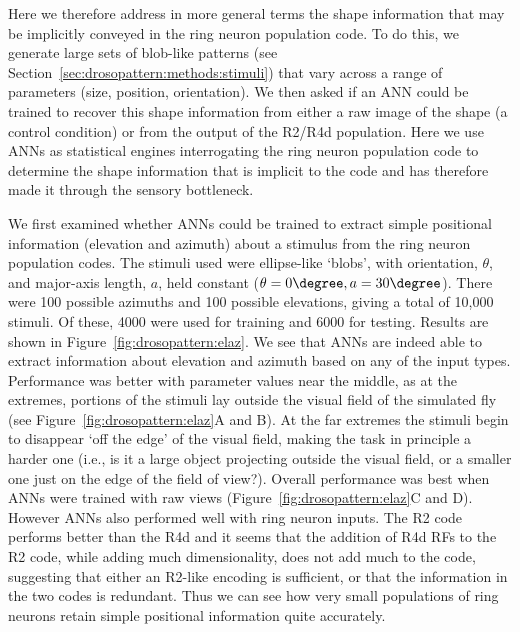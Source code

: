 Here we therefore address in more general terms the shape information that may be implicitly conveyed in the ring neuron population code.
To do this, we generate large sets of blob-like patterns (see Section~\ref{sec:drosopattern:methods:stimuli}) that vary across a range of parameters (size, position, orientation). We then asked if an \ac{ANN} could be trained to recover this shape information from either a raw image of the shape (a control condition) or from the output of the R2/R4d population. Here we use ANNs as statistical engines interrogating the ring neuron population code to determine the shape information that is implicit to the code and has therefore made it through the sensory bottleneck. 

We first examined whether ANNs could be trained to extract simple positional information (elevation and azimuth) about a stimulus from the ring neuron population codes. 
The stimuli used were ellipse-like `blobs', with orientation, $\theta$, and major-axis length, $a$, held constant ($\theta = 0\degree, a = 30\degree$).
There were 100 possible azimuths and 100 possible elevations, giving a total of 10,000 stimuli.
Of these, 4000 were used for training and 6000 for testing.
Results are shown in Figure~\ref{fig:drosopattern:elaz}.
We see that ANNs are indeed able to extract information about elevation and azimuth based on any of the input types.
Performance was better with parameter values near the middle, as at the extremes, portions of the stimuli lay outside the visual field of the simulated fly (see Figure~\ref{fig:drosopattern:elaz}A and B).
At the far extremes the stimuli begin to disappear `off the edge' of the visual field, making the task in principle a harder one (i.e., is it a large object projecting outside the visual field, or a smaller one just on the edge of the field of view?).
Overall performance was best when ANNs were trained with raw views (Figure~\ref{fig:drosopattern:elaz}C and D). However ANNs also performed well with ring neuron inputs. The R2 code performs better than the R4d and it seems that the addition of R4d \acp{RF} to the R2 code, while adding much dimensionality, does not add much to the code, suggesting that either an R2-like encoding is sufficient, or that the information in the two codes is redundant. Thus we can see how very small populations of ring neurons retain simple positional information quite accurately.



